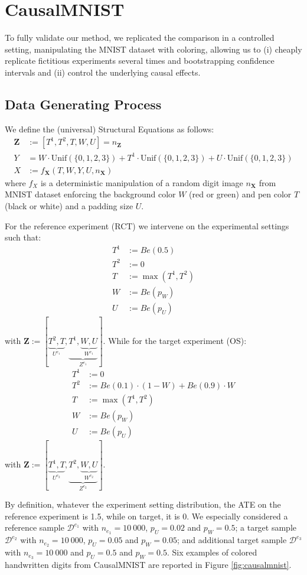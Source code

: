 \section{CausalMNIST}
\label{sec:CausalMNIST}
To fully validate our method, we replicated the comparison in a controlled setting, manipulating the MNIST dataset with coloring, allowing us to (i) cheaply replicate fictitious experiments several times and bootstrapping confidence intervals and (ii) control the underlying causal effects.

\subsection{Data Generating Process}
We define the (universal) Structural Equations as follows:
\begin{align}
    \bm{Z} &:= [T^1,T^2, T, W, U]=n_{\bm{Z}} \\
    Y &=  W \cdot \text{Unif}(\{0,1,2,3\}) + T^1 \cdot \text{Unif}(\{0,1,2,3\}) + U \cdot \text{Unif}(\{0,1,2,3\})\\
    X &:= f_{\bm{X}}(T,W,Y, U,n_{\bm{X}})
\end{align}
where $f_X$ is a deterministic manipulation of a random digit image $n_{\bm{X}}$ from MNIST dataset enforcing the background color $W$ (red or green) and pen color $T$ (black or white) and a padding size $U$. 

For the reference experiment (RCT) we intervene on the experimental settings such that:
\begin{align}
    T^1 &:= Be(0.5)\\
    T^2 &:= 0\\
    T &:= \max(T^1, T^2) \\
    W &:= Be(p_W) \\
    U &:= Be(p_U)
\end{align}
with $\bm{Z} := [\underbrace{T^2, T}_{U^{e_1}}, \underbrace{T^1, \underbrace{W, U}_{W^{e_1}}}_{Z^{e_1}}]$.
While for the target experiment (OS):
\begin{align}
    T^1 &:= 0\\
    T^2 &:= Be(0.1)\cdot (1-W) + Be(0.9)\cdot W\\
    T &:= \max(T^1, T^2) \\
    W &:= Be(p_W) \\
    U &:= Be(p_U)
\end{align}
with $\bm{Z} := [\underbrace{T^1, T}_{U^{e_2}}, \underbrace{T^2, \underbrace{W, U}_{W^{e_2}}}_{Z^{e_2}}]$.

By definition, whatever the experiment setting distribution, the ATE on the reference experiment is 1.5, while on target, it is 0. 
We especially considered a reference sample $\mathcal{D}^{e_1}$ with $n_{e_1}=10\ 000$, $p_U=0.02$ and $p_W=0.5$; a target sample $\mathcal{D}^{e_2}$ with $n_{e_2}=10\ 000$, $p_U=0.05$ and $p_W=0.05$; and additional target sample $\mathcal{D}^{e_3}$ with $n_{e_3}=10\ 000$ and $p_U=0.5$ and $p_W=0.5$. Six examples of colored handwritten digits from CausalMNIST are reported in Figure \ref{fig:causalmnist}.


